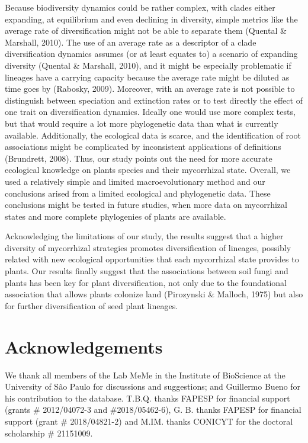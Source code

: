 \documentclass[12pt,]{article}
\begin{document}
Because biodiversity dynamics could be rather complex, with clades
either expanding, at equilibrium and even declining in diversity, simple
metrics like the average rate of diversification might not be able to
separate them (Quental \& Marshall, 2010). The use of an average rate as
a descriptor of a clade diversification dynamics assumes (or at least
equates to) a scenario of expanding diversity (Quental \& Marshall,
2010), and it might be especially problematic if lineages have a
carrying capacity because the average rate might be diluted as time goes
by (Rabosky, 2009). Moreover, with an average rate is not possible to
distinguish between speciation and extinction rates or to test directly
the effect of one trait on diversification dynamics. Ideally one would
use more complex tests, but that would require a lot more phylogenetic
data than what is currently available. Additionally, the ecological data
is scarce, and the identification of root associations might be
complicated by inconsistent applications of definitions (Brundrett,
2008). Thus, our study points out the need for more accurate ecological
knowledge on plants species and their mycorrhizal state. Overall, we
used a relatively simple and limited macroevolutionary method and our
conclusions arised from a limited ecological and phylogenetic data.
These conclusions might be tested in future studies, when more data on
mycorrhizal states and more complete phylogenies of plants are
available.

Acknowledging the limitations of our study, the results suggest that a
higher diversity of mycorrhizal strategies promotes diversification of
lineages, possibly related with new ecological opportunities that each
mycorrhizal state provides to plants. Our results finally suggest that
the associations between soil fungi and plants has been key for plant
diversification, not only due to the foundational association that
allows plants colonize land (Pirozynski \& Malloch, 1975) but also for
further diversification of seed plant lineages.

\hypertarget{acknowledgements}{%
\section{Acknowledgements}\label{acknowledgements}}

We thank all members of the Lab MeMe in the Institute of BioScience at
the University of São Paulo for discussions and suggestions; and
Guillermo Bueno for his contribution to the database. T.B.Q. thanks
FAPESP for financial support (grants \# 2012/04072-3 and
\#2018/05462-6), G. B. thanks FAPESP for financial support (grant \#
2018/04821-2) and M.IM. thanks CONICYT for the doctoral scholarship \#
21151009.
\end{document}
